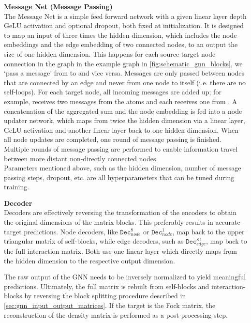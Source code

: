 \textbf{Message Net (Message Passing)}\\
The Message Net is a simple feed forward network with a given linear layer depth GeLU activation and optional dropout, both fixed at initialization. It is designed to map an input of three times the hidden dimension, which includes the node embeddings and the edge embedding of two connected nodes, to an output the size of one hidden dimension. This happens for each source-target node connection in the graph in the example graph in \autoref{fig:schematic_gnn_blocks}, we `pass a message' from  to  and vice versa. Messages are only passed between nodes that are connected by an edge and never from one node to itself (i.e. there are no self-loops). For each target node, all incoming messages are added up; for  example,  receives two messages from the  atoms and each  receives one from . A concatenation of the aggregated sum and the node embedding is fed into a node updater network, which maps from twice the hidden dimension via a linear layer, GeLU activation and another linear layer back to one hidden dimension. When all node updates are completed, one round of message passing is finished. Multiple rounds of message passing are performed to enable information travel between more distant non-directly connected nodes.\\
Parameters mentioned above, such as the hidden dimension, number of message passing steps, dropout, etc. are all hyperparameters that can be tuned during training. 

\textbf{Decoder}\\
Decoders are effectively reversing the transformation of the encoders to obtain the original dimensions of the matrix blocks. This preferably results in accurate target predictions. Node decoders, like $\texttt{Dec}^{8}_{node}$ or  $\texttt{Dec}^{1}_{node}$, map back to the upper triangular matrix of self-blocks, while edge decoders, such as $\texttt{Dec}^{8\,1}_{edge}$, map back to the full interaction matrix. Both use one linear layer which directly maps from the hidden dimension to the respective output dimension.

The raw output of the GNN needs to be inversely normalized to yield meaningful predictions. Ultimately, the full matrix is rebuilt from self-blocks and interaction-blocks by reversing the block splitting procedure described in \autoref{sec:gnn_input_output_matrices}. If the target is the Fock matrix, the reconstruction of the density matrix is performed as a post-processing step.

